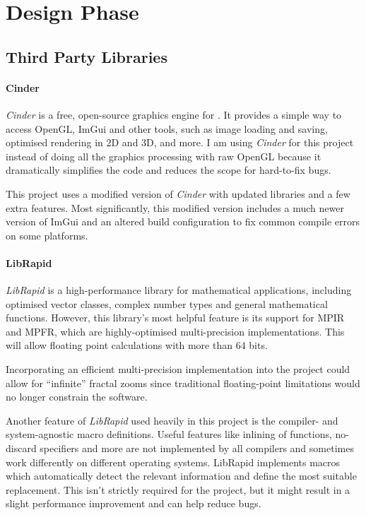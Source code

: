\section{Design Phase} \label{designPhase}

\subsection{Third Party Libraries}

\paragraph{Cinder \cite{developers_davis}} \textit{Cinder} is a free, open-source graphics engine for \CPP. It provides a simple way to access OpenGL, ImGui and other tools, such as image loading and saving, optimised rendering in 2D and 3D, and more. I am using \textit{Cinder} for this project instead of doing all the graphics processing with raw OpenGL because it dramatically simplifies the code and reduces the scope for hard-to-fix bugs.

This project uses a modified version of \textit{Cinder} with updated libraries and a few extra features. Most significantly, this modified version includes a much newer version of ImGui and an altered build configuration to fix common compile errors on some platforms.

\paragraph{LibRapid \cite{Davis_LibRapid_Optimised_Mathematics_2023}} \textit{LibRapid} is a high-performance library for mathematical applications, including optimised vector classes, complex number types and general mathematical functions. However, this library's most helpful feature is its support for MPIR and MPFR, which are highly-optimised multi-precision implementations. This will allow floating point calculations with more than 64 bits.

Incorporating an efficient multi-precision implementation into the project could allow for ``infinite'' fractal zooms since traditional floating-point limitations would no longer constrain the software.

Another feature of \textit{LibRapid} used heavily in this project is the compiler- and system-agnostic macro definitions. Useful features like inlining of functions, no-discard specifiers and more are not implemented by all compilers and sometimes work differently on different operating systems. LibRapid implements macros which automatically detect the relevant information and define the most suitable replacement. This isn't strictly required for the project, but it might result in a slight performance improvement and can help reduce bugs.

